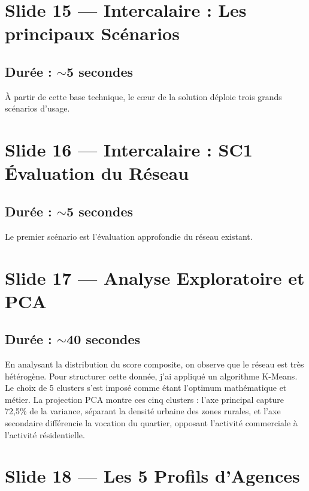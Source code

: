 \documentclass[11pt,a4paper]{article}
\begin{document}
\section{Slide 15 --- Intercalaire : Les principaux Scénarios}
\subsection{Durée : $\sim$5 secondes}
À partir de cette base technique, le cœur de la solution déploie trois grands scénarios d'usage.

\section{Slide 16 --- Intercalaire : SC1 Évaluation du Réseau}
\subsection{Durée : $\sim$5 secondes}
Le premier scénario est l'évaluation approfondie du réseau existant.

\section{Slide 17 --- Analyse Exploratoire et PCA}
\subsection{Durée : $\sim$40 secondes}
En analysant la distribution du score composite, on observe que le réseau est très hétérogène. Pour structurer cette donnée, j'ai appliqué un algorithme K-Means. Le choix de 5 clusters s'est imposé comme étant l'optimum mathématique et métier. La projection PCA montre ces cinq clusters : l'axe principal capture 72,5\% de la variance, séparant la densité urbaine des zones rurales, et l'axe secondaire différencie la vocation du quartier, opposant l'activité commerciale à l'activité résidentielle.

\section{Slide 18 --- Les 5 Profils d'Agences}
\end{document}
